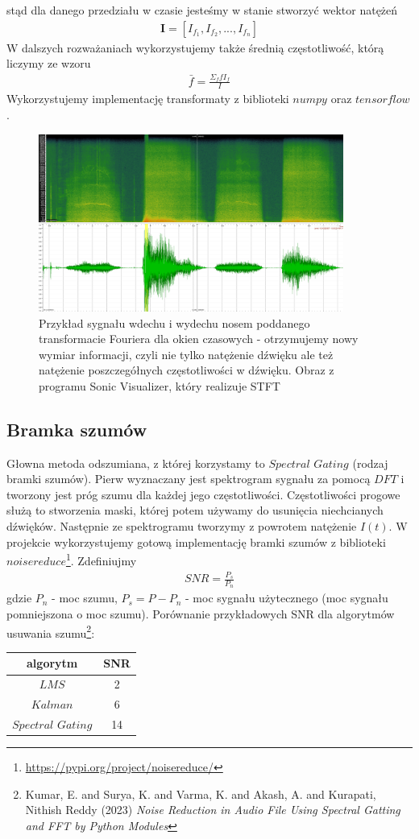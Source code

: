 \documentclass[polish]{article}
\begin{document}
stąd dla danego przedziału w czasie jesteśmy w stanie stworzyć wektor natężeń
\begin{gather*}
	\boldsymbol{I} = [I_{f_1}, I_{f_2}, ..., I_{f_n}]
\end{gather*}
W dalszych rozważaniach wykorzystujemy także średnią częstotliwość, którą liczymy ze wzoru
\begin{gather*}
	\bar{f} = \frac{\Sigma_ffI_f}{I}
\end{gather*}
Wykorzystujemy implementację transformaty z biblioteki $numpy$ oraz $tensorflow$.
\begin{figure}[H]
	\centering
	\includegraphics[width=10cm]{stft2}
	\caption{Przykład sygnału wdechu i wydechu nosem poddanego transformacie Fouriera dla okien czasowych - otrzymujemy nowy wymiar informacji, czyli nie tylko natężenie
dźwięku ale też natężenie poszczegółnych częstotliwości w dźwięku. Obraz z programu Sonic Visualizer, który realizuje STFT}
\end{figure}

\subsection{Bramka szumów}
Głowna metoda odszumiana, z której korzystamy to $Spectral$ $Gating$ (rodzaj bramki szumów).  Pierw wyznaczany jest spektrogram sygnału za pomocą $DFT$ i 
tworzony jest próg szumu dla każdej jego częstotliwości.
Częstotliwości progowe służą to stworzenia maski, której potem używamy do usunięcia niechcianych dźwięków.
Następnie ze spektrogramu tworzymy z powrotem natężenie $I(t)$. W projekcie wykorzystujemy gotową implementację bramki szumów z biblioteki $noisereduce$\footnote{\url{https://pypi.org/project/noisereduce/}}. Zdefiniujmy
\begin{gather*}
	SNR = \frac{P_s}{P_n}
\end{gather*}
gdzie $P_n$ - moc szumu, $P_s = P - P_n$ - moc sygnału użytecznego (moc sygnału pomniejszona o moc szumu).
Porównanie przykładowych SNR dla algorytmów usuwania szumu\footnote{Kumar, E. and Surya, K. and Varma, K. and Akash, A. and Kurapati, Nithish Reddy (2023) \emph{Noise Reduction in Audio File Using Spectral Gatting and FFT by Python Modules}}:
\begin{center}
\begin{tabular}{c  | c }
algorytm & SNR \\
\hline
$LMS$ & 2 \\
$Kalman$ & 6 \\
$Spectral$ $Gating$ & 14
\end{tabular}
\end{center}
\end{document}
